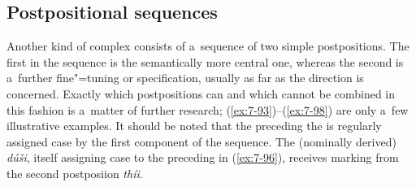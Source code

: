 \begin{exe}
\subsection{Postpositional sequences}
\label{subsec:7-2-4}

Another kind of complex  consists of a~sequence of two simple postpositions. The first in the sequence is the semantically more central one, whereas the second is a~further fine"=tuning or specification, usually as far as the direction is concerned. Exactly which postpositions can and which cannot be combined in this fashion is a~matter of further research; (\ref{ex:7-93})--(\ref{ex:7-98}) are only a~few illustrative examples. It should be noted that the  preceding the  is regularly assigned case by the first component of the sequence. The (nominally derived)  \textit{dúši}, itself assigning  case to the preceding  in (\ref{ex:7-96}), receives  marking from the second postposiion \textit{thíi}.
\largerpage


\end{exe}
